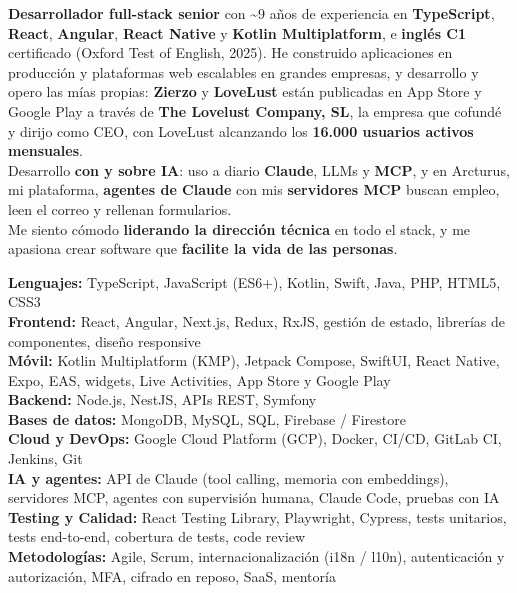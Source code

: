 \documentclass[9pt]{developercv} %
\begin{document}



\textbf{Desarrollador full-stack senior} con \textasciitilde{}9 años de experiencia en \textbf{TypeScript}, \textbf{React}, \textbf{Angular}, \textbf{React Native} y \textbf{Kotlin Multiplatform}, e \textbf{inglés C1} certificado (Oxford Test of English, 2025). He construido aplicaciones en producción y plataformas web escalables en grandes empresas, y desarrollo y opero las mías propias: \textbf{Zierzo} y \textbf{LoveLust} están publicadas en App Store y Google Play a través de \textbf{The Lovelust Company, SL}, la empresa que cofundé y dirijo como CEO, con LoveLust alcanzando los \textbf{16.000 usuarios activos mensuales}.
\\
Desarrollo \textbf{con y sobre IA}: uso a diario \textbf{Claude}, LLMs y \textbf{MCP}, y en Arcturus, mi plataforma, \textbf{agentes de Claude} con mis \textbf{servidores MCP} buscan empleo, leen el correo y rellenan formularios.
\\
Me siento cómodo \textbf{liderando la dirección técnica} en todo el stack, y me apasiona crear software que \textbf{facilite la vida de las personas}.


\textbf{Lenguajes:} TypeScript, JavaScript (ES6+), Kotlin, Swift, Java, PHP, HTML5, CSS3\\
\textbf{Frontend:} React, Angular, Next.js, Redux, RxJS, gestión de estado, librerías de componentes, diseño responsive\\
\textbf{Móvil:} Kotlin Multiplatform (KMP), Jetpack Compose, SwiftUI, React Native, Expo, EAS, widgets, Live Activities, App Store y Google Play\\
\textbf{Backend:} Node.js, NestJS, APIs REST, Symfony\\
\textbf{Bases de datos:} MongoDB, MySQL, SQL, Firebase / Firestore\\
\textbf{Cloud y DevOps:} Google Cloud Platform (GCP), Docker, CI/CD, GitLab CI, Jenkins, Git\\
\textbf{IA y agentes:} API de Claude (tool calling, memoria con embeddings), servidores MCP, agentes con supervisión humana, Claude Code, pruebas con IA\\
\textbf{Testing y Calidad:} React Testing Library, Playwright, Cypress, tests unitarios, tests end-to-end, cobertura de tests, code review\\
\textbf{Metodologías:} Agile, Scrum, internacionalización (i18n / l10n), autenticación y autorización, MFA, cifrado en reposo, SaaS, mentoría
\end{document}
